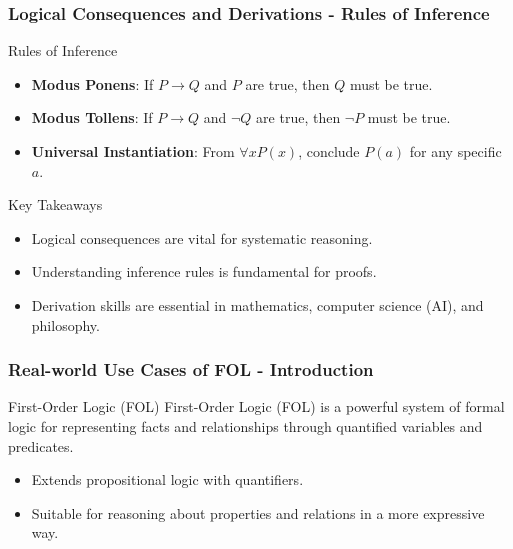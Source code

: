 \documentclass[aspectratio=169]{beamer}
\begin{document}
\begin{frame}[fragile]
    \frametitle{Logical Consequences and Derivations - Rules of Inference}
    \begin{block}{Rules of Inference}
        \begin{itemize}
            \item \textbf{Modus Ponens}: If \(P \rightarrow Q\) and \(P\) are true, then \(Q\) must be true.
            \item \textbf{Modus Tollens}: If \(P \rightarrow Q\) and \(\neg Q\) are true, then \(\neg P\) must be true.
            \item \textbf{Universal Instantiation}: From \(\forall x P(x)\), conclude \(P(a)\) for any specific \(a\).
        \end{itemize}
    \end{block}
    \begin{block}{Key Takeaways}
        \begin{itemize}
            \item Logical consequences are vital for systematic reasoning.
            \item Understanding inference rules is fundamental for proofs.
            \item Derivation skills are essential in mathematics, computer science (AI), and philosophy.
        \end{itemize}
    \end{block}
\end{frame}

\begin{frame}[fragile]
    \frametitle{Real-world Use Cases of FOL - Introduction}
    \begin{block}{First-Order Logic (FOL)}
        First-Order Logic (FOL) is a powerful system of formal logic for representing facts and relationships through quantified variables and predicates.
    \end{block}
    \begin{itemize}
        \item Extends propositional logic with quantifiers.
        \item Suitable for reasoning about properties and relations in a more expressive way.
    \end{itemize}
\end{frame}
\end{document}

